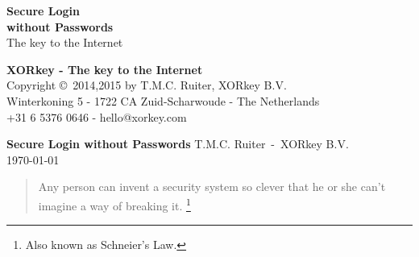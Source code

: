 \documentclass[a4paper,final]{article}
\begin{document}
\raggedbottom
\begin{titlepage}
\begin{center}
\hspace*{2.5cm}
\newline
\dashes
\vspace*{1.0cm}
\Huge
\sffamily
\textbf{\textcolor{darkxor}{Secure Login}} \\
\textbf{\textcolor{darkxor}{without Passwords}} \\
\vspace{20mm}
\hspace*{2.7cm}
\newline
\normalsize
\textcolor{darkxor}{The key to the Internet}
\end{center}
\end{titlepage}
\newpage
\thispagestyle{empty}
\vspace*{6.00cm}
\dashes
\begin{center}
\vspace*{-.5em}
\textbf{XORkey - The key to the Internet} \\
\vspace{1em}
\small
Copyright \copyright\ 2014,2015 by T.M.C. Ruiter, XORkey B.V. \\
Winterkoning 5 - 1722 CA Zuid-Scharwoude - The Netherlands \\
+31 6 5376 0646 - hello@xorkey.com 
\normalsize
\end{center}
\newpage
\begin{center}
\dashes\newline
\huge
\vspace{-0.3em}
\textsf{\textbf{\textcolor{darkxor}{Secure Login without Passwords}}}
\rmfamily
\normalsize
\newline
\dashes
\Large
\vspace*{1.0cm}
\textrm{T.M.C. Ruiter~-~XORkey B.V.} \\
\vspace{0.5cm}
\today
\normalsize
\vspace*{1.0cm}
\begin{quote}
Any person can invent a security system so clever that he or she can't imagine a way of breaking it.
\footnote{Also known as Schneier's Law.}
\end{quote}
\end{center}
\dashes
\newcommand{\includesection}[1]{\newpage}
\newcommand{\includesectionnopagebreak}[1]{}
\includesection{abstract}
\tableofcontents
\newpage
\includesection{introduction}
\includesection{general}


\newpage
\includesection{dummies}
\includesection{login}
\includesection{schema}
\includesection{security}
\includesection{implementation}
\includesectionnopagebreak{conclusion}


\listoftables
\end{document}
